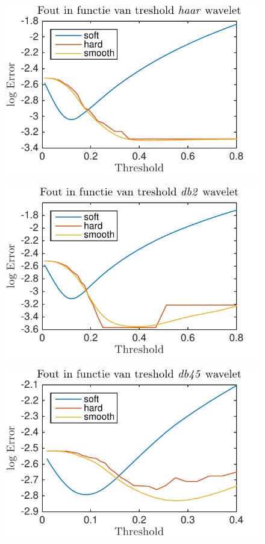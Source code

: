\begin{figure}
\centering
\includegraphics[width=0.7\linewidth]{../src/denoising/error_1d/error_exp_haar_10}
\caption{}
\label{fig:error_exp_haar_10}
\end{figure}
\begin{figure}
\centering
\includegraphics[width=0.7\linewidth]{../src/denoising/error_1d/error_exp_db2_10}
\caption{}
\label{fig:error_exp_db2_10}
\end{figure}
\begin{figure}
\centering
\includegraphics[width=0.7\linewidth]{../src/denoising/error_1d/error_exp_db45_10}
\caption{}
\label{fig:error_exp_db45_10}
\end{figure}


